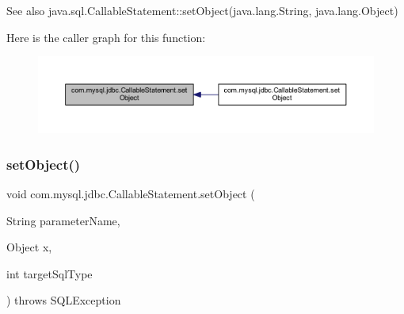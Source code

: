\begin{DoxySeeAlso}{See also}
java.\+sql.\+Callable\+Statement\+::set\+Object(java.\+lang.\+String, java.\+lang.\+Object) 
\end{DoxySeeAlso}
Here is the caller graph for this function\+:\nopagebreak
\begin{figure}[H]
\begin{center}
\leavevmode
\includegraphics[width=350pt]{classcom_1_1mysql_1_1jdbc_1_1_callable_statement_a82522267faf9a0ffc45dcba28b0fabd9_icgraph}
\end{center}
\end{figure}
\mbox{\label{classcom_1_1mysql_1_1jdbc_1_1_callable_statement_aad9b3a4c4845fc215c595ea6f9adebfd}} 
\subsubsection{\texorpdfstring{set\+Object()}{setObject()}\hspace{0.1cm}{\footnotesize\ttfamily [2/3]}}
{\footnotesize\ttfamily void com.\+mysql.\+jdbc.\+Callable\+Statement.\+set\+Object (\begin{DoxyParamCaption}\item[{String}]{parameter\+Name,  }\item[{Object}]{x,  }\item[{int}]{target\+Sql\+Type }\end{DoxyParamCaption}) throws S\+Q\+L\+Exception}

